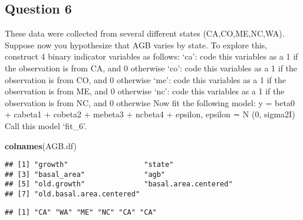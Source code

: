 \documentclass[
]{article}
\newenvironment{Shaded}{\begin{snugshade}}{\end{snugshade}}
\newcommand{\FunctionTok}[1]{\textcolor[rgb]{0.13,0.29,0.53}{\textbf{#1}}}
\newcommand{\NormalTok}[1]{#1}
\newcommand{\SpecialCharTok}[1]{\textcolor[rgb]{0.81,0.36,0.00}{\textbf{#1}}}
\begin{document}
\hypertarget{question-6}{%
\subsection{Question 6}\label{question-6}}

These data were collected from several different states
(CA,CO,ME,NC,WA). Suppose now you hypothesize that AGB varies by state.
To explore this, construct 4 binary indicator variables as follows:
`ca': code this variables as a 1 if the observation is from CA, and 0
otherwise `co': code this variables as a 1 if the observation is from
CO, and 0 otherwise `me': code this variables as a 1 if the observation
is from ME, and 0 otherwise `nc': code this variables as a 1 if the
observation is from NC, and 0 otherwise Now fit the following model: y =
beta0 + cabeta1 + cobeta2 + mebeta3 + ncbeta4 + epsilon, epsilon ∼ N (0,
sigma2I) Call this model `fit\_6'.

\begin{Shaded}
\begin{Highlighting}[]
\FunctionTok{colnames}\NormalTok{(AGB.df)}
\end{Highlighting}
\end{Shaded}

\begin{verbatim}
## [1] "growth"                  "state"                  
## [3] "basal_area"              "agb"                    
## [5] "old.growth"              "basal.area.centered"    
## [7] "old.basal.area.centered"
\end{verbatim}

\begin{Shaded}
\end{Shaded}

\begin{verbatim}
## [1] "CA" "WA" "ME" "NC" "CA" "CA"
\end{verbatim}
\end{document}
